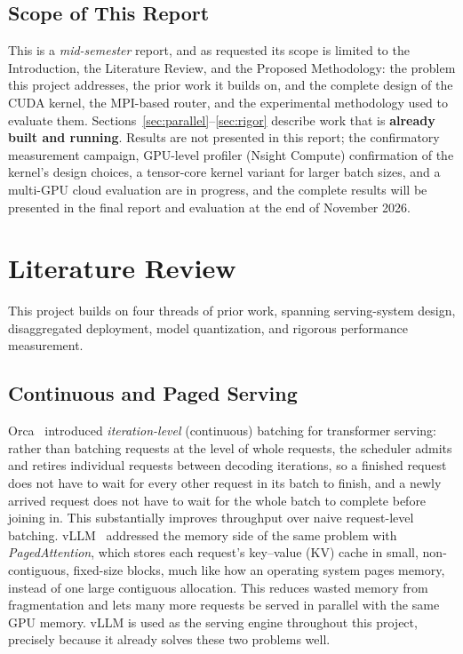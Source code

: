 \documentclass[11pt,a4paper]{article}
\begin{document}
\subsection{Scope of This Report}
This is a \emph{mid-semester} report, and as requested its scope is limited to the Introduction, the Literature
Review, and the Proposed Methodology: the problem this project addresses, the prior work it builds on, and the
complete design of the CUDA kernel, the MPI-based router, and the experimental methodology used to evaluate them.
Sections~\ref{sec:parallel}--\ref{sec:rigor} describe work that is \textbf{already built and running}. Results are not
presented in this report; the confirmatory measurement campaign, GPU-level profiler (Nsight Compute) confirmation of
the kernel's design choices, a tensor-core kernel variant for larger batch sizes, and a multi-GPU cloud evaluation are
in progress, and the complete results will be presented in the final report and evaluation at the end of November
2026.

\section{Literature Review}
\label{sec:lit}
This project builds on four threads of prior work, spanning serving-system design, disaggregated deployment,
model quantization, and rigorous performance measurement.

\subsection{Continuous and Paged Serving}
Orca~\cite{orca} introduced \emph{iteration-level} (continuous) batching for transformer serving: rather than
batching requests at the level of whole requests, the scheduler admits and retires individual requests between
decoding iterations, so a finished request does not have to wait for every other request in its batch to finish, and
a newly arrived request does not have to wait for the whole batch to complete before joining in. This substantially
improves throughput over naive request-level batching. vLLM~\cite{vllm} addressed the memory side of the same
problem with \emph{PagedAttention}, which stores each request's key--value (KV) cache in small, non-contiguous,
fixed-size blocks, much like how an operating system pages memory, instead of one large contiguous allocation. This
reduces wasted memory from fragmentation and lets many more requests be served in parallel with the same GPU memory.
vLLM is used as the serving engine throughout this project, precisely because it already solves these two problems
well.
\end{document}
